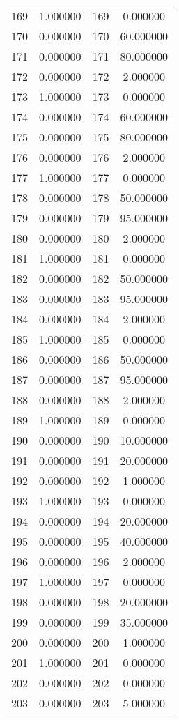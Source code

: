 \documentclass[12pt]{article}
\begin{document}
\begin{longtable}{@{}cccc@{}}
169 & 1.000000 & 169 & 0.000000 \\
170 & 0.000000 & 170 & 60.000000 \\
171 & 0.000000 & 171 & 80.000000 \\
172 & 0.000000 & 172 & 2.000000 \\
173 & 1.000000 & 173 & 0.000000 \\
174 & 0.000000 & 174 & 60.000000 \\
175 & 0.000000 & 175 & 80.000000 \\
176 & 0.000000 & 176 & 2.000000 \\
177 & 1.000000 & 177 & 0.000000 \\
178 & 0.000000 & 178 & 50.000000 \\
179 & 0.000000 & 179 & 95.000000 \\
180 & 0.000000 & 180 & 2.000000 \\
181 & 1.000000 & 181 & 0.000000 \\
182 & 0.000000 & 182 & 50.000000 \\
183 & 0.000000 & 183 & 95.000000 \\
184 & 0.000000 & 184 & 2.000000 \\
185 & 1.000000 & 185 & 0.000000 \\
186 & 0.000000 & 186 & 50.000000 \\
187 & 0.000000 & 187 & 95.000000 \\
188 & 0.000000 & 188 & 2.000000 \\
189 & 1.000000 & 189 & 0.000000 \\
190 & 0.000000 & 190 & 10.000000 \\
191 & 0.000000 & 191 & 20.000000 \\
192 & 0.000000 & 192 & 1.000000 \\
193 & 1.000000 & 193 & 0.000000 \\
194 & 0.000000 & 194 & 20.000000 \\
195 & 0.000000 & 195 & 40.000000 \\
196 & 0.000000 & 196 & 2.000000 \\
197 & 1.000000 & 197 & 0.000000 \\
198 & 0.000000 & 198 & 20.000000 \\
199 & 0.000000 & 199 & 35.000000 \\
200 & 0.000000 & 200 & 1.000000 \\
201 & 1.000000 & 201 & 0.000000 \\
202 & 0.000000 & 202 & 0.000000 \\
203 & 0.000000 & 203 & 5.000000 \\

\end{longtable}
\end{document}
